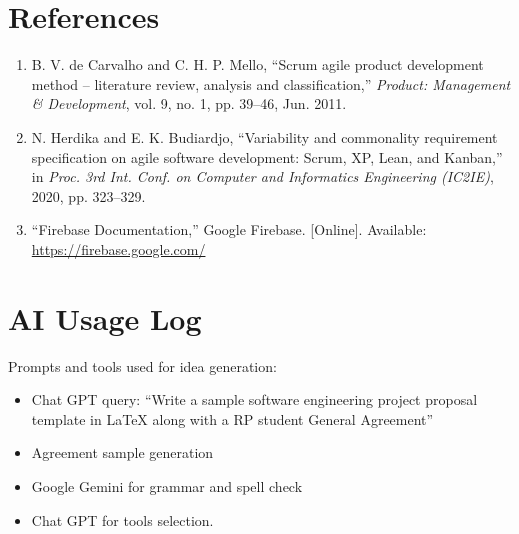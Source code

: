 \documentclass[12pt,a4paper]{article}
\begin{document}
\section{References}
\begin{enumerate}
    \item B. V. de Carvalho and C. H. P. Mello, “Scrum agile product development method – literature review, analysis and classification,” \textit{Product: Management \& Development}, vol. 9, no. 1, pp. 39–46, Jun. 2011.
    
    \item N. Herdika and E. K. Budiardjo, “Variability and commonality requirement specification on agile software development: Scrum, XP, Lean, and Kanban,” in \textit{Proc. 3rd Int. Conf. on Computer and Informatics Engineering (IC2IE)}, 2020, pp. 323–329.

    \item “Firebase Documentation,” Google Firebase. [Online]. Available: \url{https://firebase.google.com/}
\end{enumerate}


\section*{AI Usage Log}
Prompts and tools used for idea generation:
\begin{itemize}
    \item Chat GPT query: “Write a sample software engineering project proposal template in LaTeX along with a RP student General Agreement”
    \item Agreement sample generation
    \item  Google Gemini for grammar and spell check
    \item  Chat GPT for tools selection. 
\end{itemize}
\end{document}
